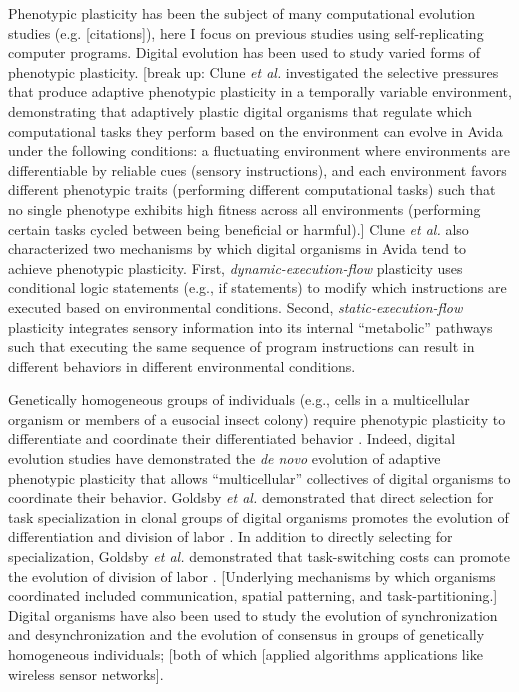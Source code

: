 Phenotypic plasticity has been the subject of many computational evolution studies (e.g. [citations]), here I focus on previous studies using self-replicating computer programs. 
Digital evolution has been used to study varied forms of phenotypic plasticity. 
[break up: Clune \textit{et al.} investigated the selective pressures that produce adaptive phenotypic plasticity in a temporally variable environment, demonstrating that adaptively plastic digital organisms that regulate which computational tasks they perform based on the environment can evolve in Avida under the following conditions:  
a fluctuating environment where environments are differentiable by reliable cues (sensory instructions), and each environment favors different phenotypic traits (performing different computational tasks) such that no single phenotype exhibits high fitness across all environments (performing certain tasks cycled between being beneficial or harmful).]
Clune \textit{et al.} also characterized two mechanisms by which digital organisms in Avida tend to achieve phenotypic plasticity.
First, \textit{dynamic-execution-flow} plasticity uses conditional logic statements (e.g., if statements) to modify which instructions are executed based on environmental conditions. 
Second, \textit{static-execution-flow} plasticity integrates sensory information into its internal ``metabolic'' pathways such that executing the same sequence of program instructions can result in different behaviors in different environmental conditions.

Genetically homogeneous groups of individuals (e.g., cells in a multicellular organism or members of a eusocial insect colony) require phenotypic plasticity to differentiate and coordinate their differentiated behavior \citep{schlichting_origins_2003}. 
Indeed, digital evolution studies have demonstrated the \textit{de novo} evolution of adaptive phenotypic plasticity that allows  ``multicellular'' collectives of digital organisms to coordinate their behavior.
Goldsby \textit{et al.} demonstrated that direct selection for task specialization in clonal groups of digital organisms promotes the evolution of differentiation and division of labor \citep{goldsby_evolution_2010}.
In addition to directly selecting for specialization, Goldsby \textit{et al.} demonstrated that task-switching costs can promote the evolution of division of labor \citep{goldsby_evolution_2010,goldsby_task-switching_2012}.
[Underlying mechanisms by which organisms coordinated included communication, spatial patterning, and task-partitioning.]
Digital organisms have also been used to study the evolution of synchronization and desynchronization \citep{knoester_evolution_2011} and the evolution of consensus \citep{knoester_genetic_2013} in groups of genetically homogeneous individuals; [both of which [applied algorithms applications like wireless sensor networks]. 

